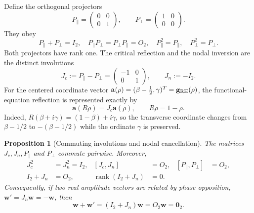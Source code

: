 \documentclass[11pt]{article}
\newtheorem{proposition}[definition]{Proposition}
\newcommand{\vzero}{\mathbf 0}
\begin{document}
Define the orthogonal projectors
\begin{equation}\label{eq:projectors}
 P_{\parallel}=\begin{pmatrix}0&0\\0&1\end{pmatrix},\qquad
 P_{\perp}=\begin{pmatrix}1&0\\0&0\end{pmatrix}.
\end{equation}
They obey
\begin{equation}
 P_{\parallel}+P_{\perp}=I_2,\quad
 P_{\parallel}P_{\perp}=P_{\perp}P_{\parallel}=O_2,\quad
 P_{\parallel}^2=P_{\parallel},\quad P_{\perp}^2=P_{\perp}.
\end{equation}
Both projectors have rank one.  The critical reflection and the nodal inversion are the
distinct involutions
\begin{equation}\label{eq:critical-nodal-involutions}
 J_c:=P_{\parallel}-P_{\perp}
 =\begin{pmatrix}-1&0\\0&1\end{pmatrix},
 \qquad
 J_n:=-I_2.
\end{equation}
For the centered coordinate vector
$\mathbf a(\rho)=(\beta-\tfrac12,\gamma)^T=\mathbf g_{\rm RH}(\rho)$,
the functional-equation reflection is represented exactly by
\begin{equation}\label{eq:critical-reflection-matrix}
 \mathbf a(R\rho)=J_c\mathbf a(\rho),
 \qquad R\rho=1-\overline\rho.
\end{equation}
Indeed, $R(\beta+i\gamma)=(1-\beta)+i\gamma$, so the transverse coordinate changes
from $\beta-1/2$ to $-(\beta-1/2)$ while the ordinate $\gamma$ is preserved.

\begin{proposition}[Commuting involutions and nodal cancellation]
\label{prop:matrix-commutation}
The matrices $J_c,J_n,P_{\parallel}$ and $P_{\perp}$ commute pairwise.  Moreover,
\begin{align}\label{eq:matrix-commutation}
 J_c^2&=J_n^2=I_2,&
 [J_c,J_n]&=O_2,&
 [P_{\parallel},P_{\perp}]&=O_2,\\
 I_2+J_n&=O_2,&
 \operatorname{rank}(I_2+J_n)&=0.&
\end{align}
Consequently, if two real amplitude vectors are related by phase opposition,
$\mathbf w'=J_n\mathbf w=-\mathbf w$, then
\begin{equation}\label{eq:matrix-nodal-cancellation}
 \mathbf w+\mathbf w'=(I_2+J_n)\mathbf w=O_2\mathbf w=\vzero_2.
\end{equation}
\end{proposition}
\end{document}
